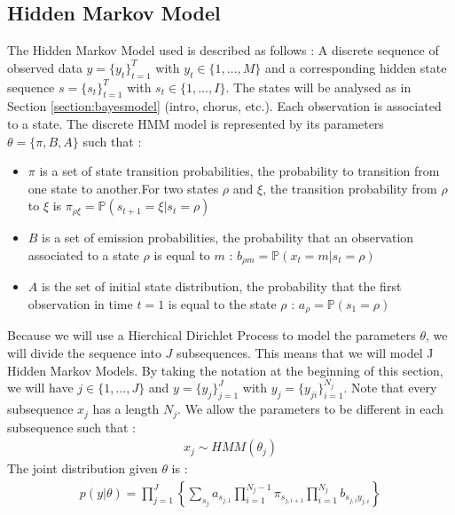 \subsection{Hidden Markov Model}
The Hidden Markov Model used is described as follows : A discrete sequence of observed data $y=\{y_t\}^T_{t=1}$ with $y_t \in \{1,\dots, M \}$ and a corresponding hidden state sequence $s=\{s_t\}^T_{t=1}$ with $s_t \in \{ 1, \dots, I \}$. The states will be analysed as in Section \ref{section:bayesmodel} (intro, chorus, etc.). Each observation is associated to a state. The discrete HMM model is represented by its parameters $\theta=\{\pi,B,A\}$ such that : 
\begin{itemize}
	\item $\pi$ is a set of state transition probabilities, the probability to transition from one state to another.For two states $\rho$ and $\xi$, the transition probability from $\rho$ to $\xi$ is $\pi_{\rho\xi}=\mathbb P(s_{t+1}=\xi | s_t=\rho)$
	\item $B$ is a set of emission probabilities, the probability that an observation associated to a state $\rho$ is equal to $m$ : $b_{\rho m}=\mathbb P(x_t= m | s_t=\rho)$
	\item  $A$ is the set of initial state distribution, the probability that the first observation in time $t=1$ is equal to the state $\rho$ : $a_{\rho}=\mathbb P(s_1=\rho)$
\end{itemize}
Because we will use a Hierchical Dirichlet Process to model the parameters $\theta$, we will divide the sequence into $J$ subsequences. This means that we will model J Hidden Markov Models. By taking the notation at the beginning of this section, we will have $j\in \{1, \dots, J\}$ and $y=\{y_j\}_{j=1}^J$ with $y_j=\{ y_{ji}\}_{i=1}^{N_j}$. Note that every subsequence $x_j$ has a length $N_j$. We allow the parameters to be different in each subsequence such that : \begin{align*}
 		x_j \sim HMM(\theta_j)
 \end{align*}
The joint distribution given $\theta$ is : 
\begin{align*}
	p(y|\theta)=\prod^J_{j=1}\left\{ \sum_{s_j}a_{s_{j,1}}\prod^{N_j-1}_{i=1}\pi_{s_{j,i+1}} \prod^{N_j}_{i=1} b_{s_{j,i}y_{j,i}} \right\}
\end{align*} \\

